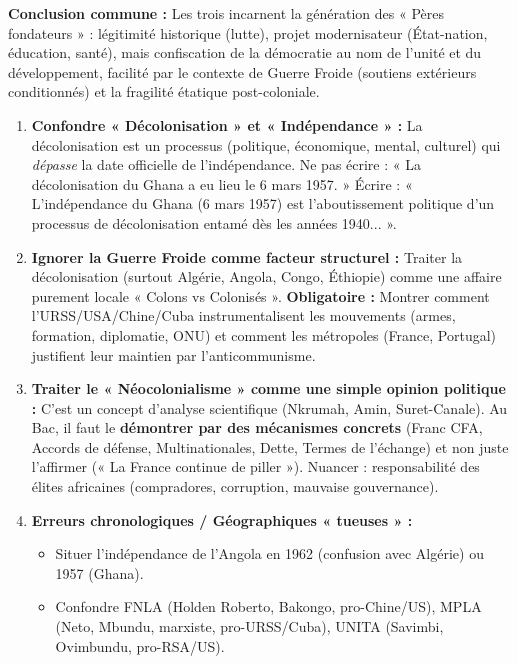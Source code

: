 \documentclass[11pt]{article}
\newcommand{\cle}[1]{{\popxbold\color{popdark}#1}}
\begin{document}
\begin{exoresolu}
\par \textbf{Conclusion commune :} Les trois incarnent la \cle{génération des « Pères fondateurs »} : légitimité historique (lutte), projet modernisateur (État-nation, éducation, santé), mais \cle{confiscation de la démocratie} au nom de l'unité et du développement, facilité par le contexte de \cle{Guerre Froide} (soutiens extérieurs conditionnés) et la \cle{fragilité étatique} post-coloniale.
\end{exoresolu}

\begin{attention}
\begin{enumerate}
    \item \textbf{Confondre « Décolonisation » et « Indépendance » :} La décolonisation est un \cle{processus} (politique, économique, mental, culturel) qui \emph{dépasse} la date officielle de l'indépendance. Ne pas écrire : « La décolonisation du Ghana a eu lieu le 6 mars 1957. » Écrire : « L'indépendance du Ghana (6 mars 1957) est l'aboutissement politique d'un processus de décolonisation entamé dès les années 1940... ».
    \item \textbf{Ignorer la Guerre Froide comme facteur structurel :} Traiter la décolonisation (surtout Algérie, Angola, Congo, Éthiopie) comme une affaire purement locale « Colons vs Colonisés ». \textbf{Obligatoire :} Montrer comment l'URSS/USA/Chine/Cuba instrumentalisent les mouvements (armes, formation, diplomatie, ONU) et comment les métropoles (France, Portugal) justifient leur maintien par l'anticommunisme.
    \item \textbf{Traiter le « Néocolonialisme » comme une simple opinion politique :} C'est un \cle{concept d'analyse scientifique} (Nkrumah, Amin, Suret-Canale). Au Bac, il faut le \textbf{démontrer par des mécanismes concrets} (Franc CFA, Accords de défense, Multinationales, Dette, Termes de l'échange) et non juste l'affirmer (« La France continue de piller »). Nuancer : responsabilité des élites africaines (\cle{compradores}, corruption, mauvaise gouvernance).
    \item \textbf{Erreurs chronologiques / Géographiques « tueuses » :}
    \begin{itemize}
        \item Situer l'indépendance de l'Angola en 1962 (confusion avec Algérie) ou 1957 (Ghana).
        \item Confondre \cle{FNLA} (Holden Roberto, Bakongo, pro-Chine/US), \cle{MPLA} (Neto, Mbundu, marxiste, pro-URSS/Cuba), \cle{UNITA} (Savimbi, Ovimbundu, pro-RSA/US).

\end{itemize}
\end{enumerate}
\end{attention}
\end{document}

